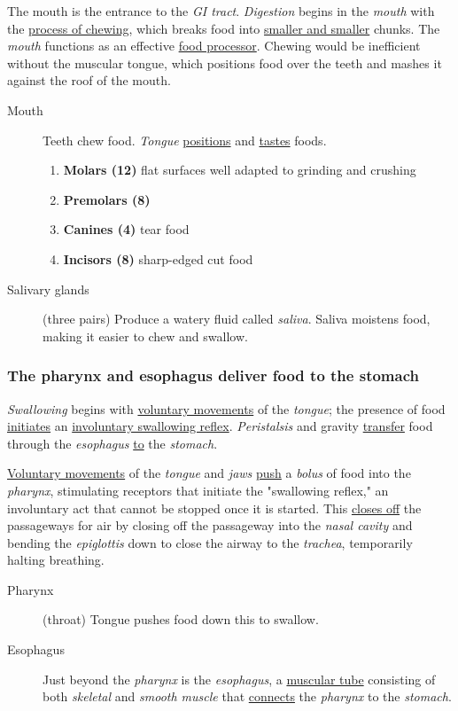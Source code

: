\documentclass[11pt]{article}
\begin{document}
The mouth is the entrance to the \emph{GI tract}. \emph{Digestion} begins in the \emph{mouth} with
the \uline{process of chewing}, which breaks food into \uline{smaller and smaller} chunks. The
\emph{mouth} functions as an effective \uline{food processor}. Chewing would be inefficient
without the muscular tongue, which positions food over the teeth and mashes it
against the roof of the mouth.

\begin{description}
\item[{Mouth}] Teeth chew food. \emph{Tongue} \uline{positions} and \uline{tastes} foods.
\begin{enumerate}
\item \textbf{Molars (12)} flat surfaces well adapted to grinding and crushing
\item \textbf{Premolars (8)}
\item \textbf{Canines (4)} tear food
\item \textbf{Incisors (8)} sharp-edged cut food
\end{enumerate}
\item[{Salivary glands}] (three pairs) Produce a watery fluid called \emph{saliva}. Saliva
moistens food, making it easier to chew and swallow.
\end{description}

\subsubsection{The pharynx and esophagus deliver food to the stomach}
\label{sec:org87862d5}
\emph{Swallowing} begins with \uline{voluntary movements} of the \emph{tongue}; the presence of food
\uline{initiates} an \uline{involuntary swallowing reflex}. \emph{Peristalsis} and gravity \uline{transfer}
food through the \emph{esophagus} \uline{to} the \emph{stomach}.

\uline{Voluntary movements} of the \emph{tongue} and \emph{jaws} \uline{push} a \emph{bolus} of food into the
\emph{pharynx}, stimulating receptors that initiate the "swallowing reflex," an
involuntary act that cannot be stopped once it is started. This \uline{closes off} the
passageways for air by closing off the passageway into the \emph{nasal cavity} and
bending the \emph{epiglottis} down to close the airway to the \emph{trachea}, temporarily
halting breathing.

\begin{description}
\item[{Pharynx}] (throat) Tongue pushes food down this to swallow.
\item[{Esophagus}] Just beyond the \emph{pharynx} is the \emph{esophagus}, a \uline{muscular tube}
consisting of both \emph{skeletal} and \emph{smooth muscle} that \uline{connects} the \emph{pharynx}
to the \emph{stomach}.
\end{description}
\end{document}
